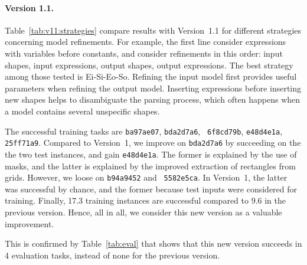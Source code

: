 \documentclass[a4paper]{llncs}
\begin{document}
\paragraph{Version 1.1.}  Table~\ref{tab:v11:strategies} compare
results with Version~1.1 for different strategies concerning model
refinements. For example, the first line consider expressions with
variables before constants, and consider refinements in this order:
input shapes, input expressions, output shapes, output expressions.
The best strategy among those tested is Ei-Si-Eo-So. Refining the
input model first provides useful parameters when refining the output
model. Inserting expressions before inserting new shapes helps to
disambiguate the parsing process, which often happens when a model
contains several unspecific shapes.

The successful training tasks are {\tt ba97ae07}, {\tt bda2d7a6}, {\tt
  6f8cd79b}, {\tt e48d4e1a}, {\tt 25ff71a9}. Compared to Version~1, we
improve on {\tt bda2d7a6} by succeeding on the the two test instances,
and gain {\tt e48d4e1a}. The former is explained by the use of masks,
and the latter is explained by the improved extraction of rectangles
from grids.
%
However, we loose on {\tt b94a9452} and {\tt
  5582e5ca}. In Version~1, the latter was successful by chance, and
the former because test inputs were considered for training.
%
Finally, 17.3 training instances are successful compared to 9.6 in the
previous version. Hence, all in all, we consider this new version as a
valuable improvement.

This is confirmed by Table~\ref{tab:eval} that shows that this new
version succeeds in 4 evaluation tasks, instead of none for the
previous version.

\end{document}

